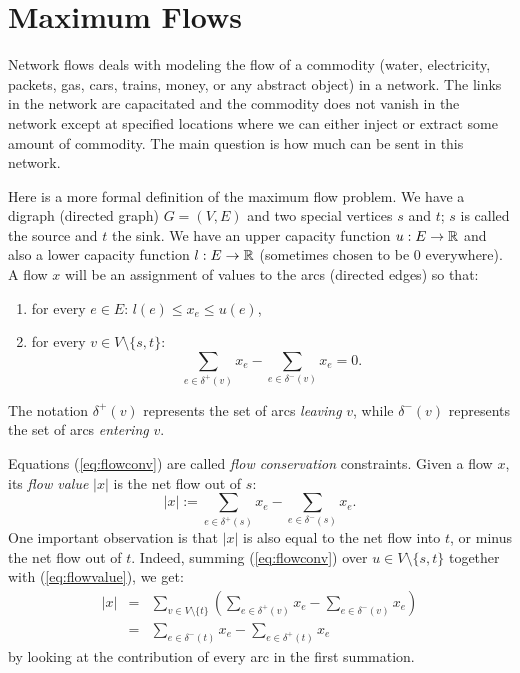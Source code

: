 \documentclass[12pt]{article}
\begin{document}

\section{Maximum Flows}

Network flows deals with modeling the flow of a commodity (water,
electricity, packets, gas, cars, trains, money, or any abstract object) in
a network. The links in the network are capacitated
and the commodity does not vanish in the network except at specified
locations where we can either inject or extract some amount of
commodity. The main question is how much can be sent in this network. 

Here is a more formal definition of the maximum flow problem. We have
a digraph (directed graph) $G=(V,E)$ and two special vertices $s$ and
$t$; $s$ is called the source and $t$ the sink.  We have an upper
capacity function $u: E \rightarrow {\mathbb R}$ and also a lower capacity
function $l: E \rightarrow {\mathbb R}$ (sometimes chosen to be 0
everywhere). A flow $x$ will be an assignment of values to the arcs
(directed edges) so that:
\begin{enumerate}
\item
for every $e\in E$: $l(e) \leq x_e \leq u(e)$,
\item
for every $v\in V\setminus \{s,t\}$:
\begin{equation} \label{eq:flowconv}
\sum_{e\in \delta^+(v)} x_e - \sum_{e\in \delta^-(v)} x_e =0.
\end{equation}
\end{enumerate}
The notation $\delta^+(v)$ represents the set of arcs {\it leaving}
$v$, while $\delta^-(v)$ represents the set of arcs {\it entering}
$v$. 

Equations (\ref{eq:flowconv}) are called {\it flow conservation} 
constraints. Given a flow $x$, its {\it flow value} $|x|$ is the net
flow out of $s$:
\begin{equation} \label{eq:flowvalue}
|x|:= \sum_{e\in \delta^+(s)} x_e - \sum_{e\in \delta^-(s)} x_e.
\end{equation}
One important observation is that $|x|$ is also equal to the net flow
into $t$, or minus the net flow out of $t$. Indeed, summing
(\ref{eq:flowconv}) over $u\in V\setminus\{s,t\}$ together with 
(\ref{eq:flowvalue}), we get:
\begin{eqnarray*}
|x|& = & \sum_{v\in V\setminus\{t\}} \left(\sum_{e\in \delta^+(v)} x_e - \sum_{e\in \delta^-(v)} x_e \right) \\
& = & \sum_{e\in \delta^-(t)} x_e - \sum_{e\in \delta^+(t)} x_e
\end{eqnarray*}
by looking at the contribution of every arc in the first summation. 
\end{document}
